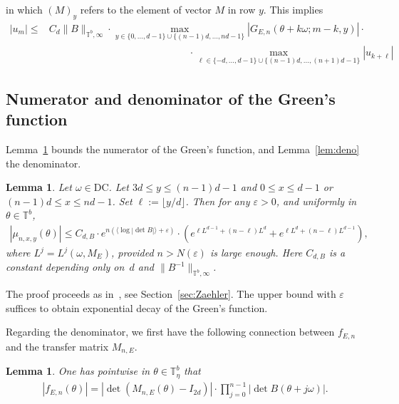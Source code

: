 \documentclass[11pt]{amsart}
\newtheorem{lemma}[theorem]{Lemma}
\newcommand{\T}{\mathbb T}
\begin{document}
in which $(M)_y$ refers to the element of vector $M$ in row $y$.
This implies 
\begin{align}\label{eq:Poisson_exp}
|{u}_m|\leq &C_d \|B\|_{\T^b, \infty}\cdot \max_{y\in \{0,...,d-1\}\cup \{(n-1)d,...,nd-1\}} |G_{E,n}(\theta+k\omega; m-k, y)|\cdot \\
&\qquad\qquad\qquad\qquad\qquad\qquad\qquad\cdot \max_{\ell\in \{-d,...,d-1\}\cup \{(n-1)d,...,(n+1)d-1\}} |{u}_{k+\ell}|
\end{align}


\subsection{Numerator and denominator of the Green's function}\label{sec:lemma}
 Lemma~\ref{lem:numerator} bounds the numerator of the Green's function, and Lemma~\ref{lem:deno} the denominator.

\begin{lemma}\label{lem:numerator}
Let $\omega\in \mathrm{DC}$.
Let $3d\leq y\leq (n-1)d-1$ and $0\leq x\leq d-1$ or $(n-1)d\leq x\leq nd-1$. Set $\ell:=\lfloor y/d\rfloor$. Then 
for any $\varepsilon>0$, and uniformly in $\theta\in \T^b$, 
\begin{align}
|\mu_{n,x,y}(\theta)|\leq C_{d,B} \cdot e^{n(\langle\log |\det B|\rangle+\varepsilon)} \cdot \left(e^{\ell {L}^{d-1}+(n-\ell){L}^d}+e^{\ell {L}^d+(n-\ell){L}^{d-1}}\right),
\end{align}
where $L^j=L^j(\omega,M_E)$, provided $n>N(\varepsilon)$ is large enough. 
Here $C_{d,B}$ is a constant depending only on~$d$ and $\|B^{-1}\|_{\T^b, \infty}$. 
\end{lemma}

The proof proceeds as in~\cite{HS3}, see Section~\ref{sec:Zaehler}. The upper bound with $\varepsilon$ suffices to obtain exponential decay of the Green's function. 

Regarding the denominator, we first have the following connection between $f_{E,n}$ and the transfer matrix $M_{n,E}$.
\begin{lemma}\label{lem:detP}
One has pointwise in $\theta\in \T^b_{\eta}$ that
\begin{align}
|f_{E,n}(\theta)|=  |\det (M_{n,E}(\theta)-I_{2d})| \cdot \prod_{j=0}^{n-1}|\det B(\theta+j\omega)| .
\end{align}
\end{lemma}
\end{document}
